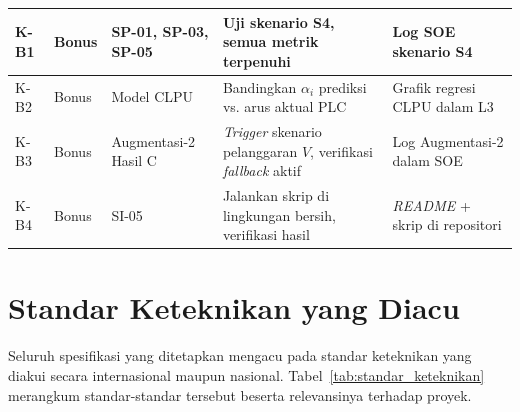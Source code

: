\begin{longtable}{|p{1.2cm}|p{2cm}|p{3.5cm}|p{3.5cm}|p{3.5cm}|}
K-B1 & Bonus & SP-01, SP-03, SP-05 & Uji skenario S4, semua metrik terpenuhi & Log SOE skenario S4 \\ \hline
K-B2 & Bonus & Model CLPU & Bandingkan $\alpha_{i}$ prediksi vs. arus aktual PLC & Grafik regresi CLPU dalam L3 \\ \hline
K-B3 & Bonus & Augmentasi-2 Hasil C & \textit{Trigger} skenario pelanggaran $V$, verifikasi \textit{fallback} aktif & Log Augmentasi-2 dalam SOE \\ \hline
K-B4 & Bonus & SI-05 & Jalankan skrip di lingkungan bersih, verifikasi hasil & \textit{README} + skrip di repositori \\
\end{longtable}

\section{Standar Keteknikan yang Diacu}
\label{sec:Standar_Keteknikan_Diacu}

Seluruh spesifikasi yang ditetapkan mengacu pada standar keteknikan yang diakui secara internasional maupun nasional. Tabel~\ref{tab:standar_keteknikan} merangkum standar-standar tersebut beserta relevansinya terhadap proyek.

